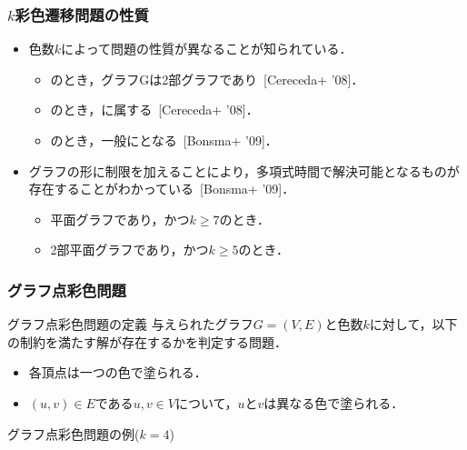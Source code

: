 \begin{frame}\frametitle{$k$彩色遷移問題の性質}

  \begin{itemize}
    \item 色数$k$によって問題の性質が異なることが知られている．
    \begin{itemize}
      \item {}のとき，グラフGは2部グラフであり~[Cereceda+ '08]．
      \item {}のとき，に属する~[Cereceda+ '08]．
      \item {}のとき，一般にとなる~[Bonsma+ '09]．
    \end{itemize}

    \item グラフの形に制限を加えることにより，多項式時間で解決可能となるものが存在することがわかっている~[Bonsma+ '09]．
    \begin{itemize}
      \item 平面グラフであり，かつ$k \ge 7$のとき．
      \item 2部平面グラフであり，かつ$k \ge 5$のとき．
    \end{itemize}

  \end{itemize}

\end{frame}

\begin{frame}\frametitle{グラフ点彩色問題}
    
  \begin{block}{グラフ点彩色問題の定義}
    与えられたグラフ$G=(V, E)$と色数$k$に対して，以下の制約を満たす解が存在するかを判定する問題．
    \begin{itemize}
      \item 各頂点は一つの色で塗られる．
      \item $(u, v) \in E$である$u, v \in V$について，$u$と$v$は異なる色で塗られる．
    \end{itemize}
  \end{block}
  
  \begin{exampleblock}{グラフ点彩色問題の例($k=4$)}
    \begin{columns}
      \begin{column}{1.0\textwidth}
        \centering
        
      \end{column}
    \end{columns}
  \end{exampleblock}

\end{frame}

